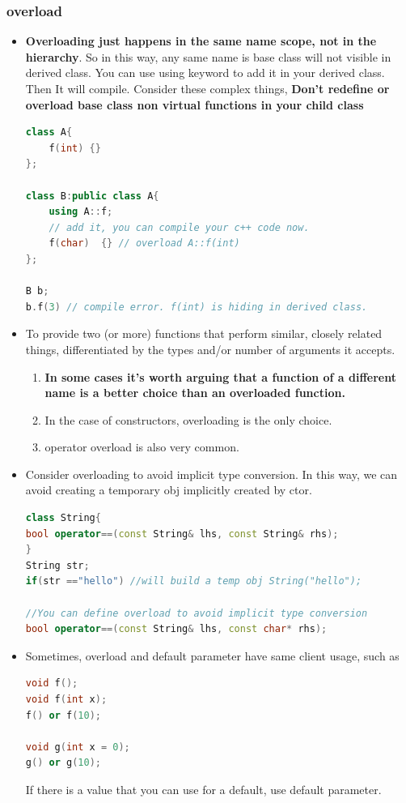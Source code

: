 \documentclass[a4paper,12pt,twoside]{book}
\begin{document}
\subsubsection{overload}
\begin{itemize}

\item  \textbf{Overloading just happens in the same name scope, not in the hierarchy}. So in this way, any same name is base class will not  visible in derived class. You can use using keyword to add it in your derived class. Then It will compile. Consider these complex things, \textbf{Don't redefine or overload base class non virtual functions in your child class}

\begin{lstlisting}[frame=single, language=c++]
class A{
    f(int) {}
};

class B:public class A{
    using A::f;
    // add it, you can compile your c++ code now.
    f(char)  {} // overload A::f(int)
};

B b;
b.f(3) // compile error. f(int) is hiding in derived class.
\end{lstlisting}

\item To provide two (or more) functions that perform similar, closely related things, differentiated by the types and/or number of arguments it accepts.

\begin{enumerate}
\item \textbf{In some cases it's worth arguing that a function of a different name is a better choice than an overloaded function.}
		
\item  In the case of constructors, overloading is the only choice.

\item  operator overload is also very common.
\end{enumerate}

\item Consider overloading to avoid implicit type conversion. In this way, we can avoid creating a temporary obj implicitly created by ctor.

\begin{lstlisting}[frame=single, language=c++]
class String{
bool operator==(const String& lhs, const String& rhs);
}
String str;
if(str =="hello") //will build a temp obj String("hello");

//You can define overload to avoid implicit type conversion
bool operator==(const String& lhs, const char* rhs);
\end{lstlisting}


\item Sometimes, overload and default parameter have same client usage, such as
\begin{lstlisting}[frame=single, language=c++]
void f();
void f(int x);
f() or f(10);

void g(int x = 0);
g() or g(10);
\end{lstlisting}
If there is a value that you can use for a default, use default parameter.

\end{itemize}
\end{document}

